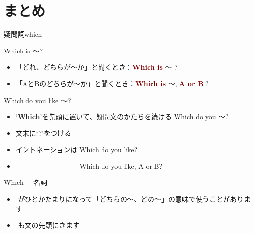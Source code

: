 \documentclass[aspectratio=169,xcolor={dvipsnames,table}]{beamer}
\begin{document}
\section{まとめ}
\begin{frame}[plain]{疑問詞which }
 
\begin{block}{Which is ～?}
\small
\begin{itemize}[square]\small
 \item 「どれ、どちらが～か」と聞くとき：\textcolor{Maroon}{\bfseries Which is}   〜 ?
 \item 「AとBのどちらが～か」と聞くとき：\textcolor{Maroon}{\bfseries Which is} 〜, \textcolor{Maroon}{\bfseries A or B} ?
\end{itemize}
     \end{block}

\begin{block}{Which do you like ～?}
\begin{itemize}[square]\small
 \item `{\bfseries Which}'を先頭に置いて、疑問文のかたちを続ける\,\,Which do you  〜?
 \item   文末に`?'をつける
 \item イントネーションは Which do you like? \myDownwardPitch
 \item 　　　　　　　　　 Which do you like, A \myRisingPitch or B? \myDownwardPitch\end{itemize}
     \end{block}

\begin{block}{Which $+$ 名詞}\small
\begin{itemize}[square]\small
 \item {}\,\,がひとかたまりになって「どちらの〜、どの～」の意味で使うことがあります
 \item {}\,\,も文の先頭にきます
\end{itemize}
     \end{block}
\end{frame}
\end{document}
